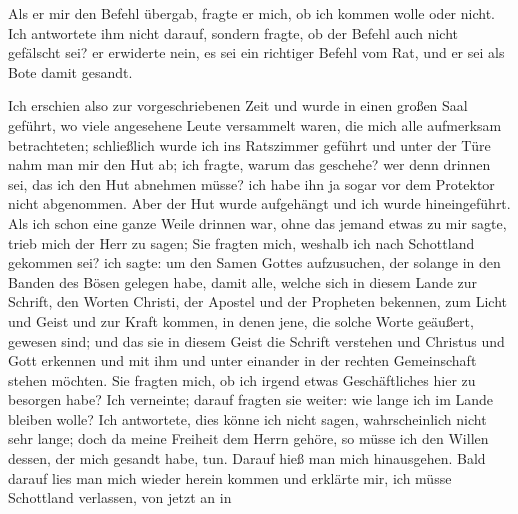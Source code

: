 

Als er mir den Befehl übergab, fragte er mich, ob ich kommen
wolle oder nicht. Ich antwortete ihm nicht darauf, sondern
fragte, ob der Befehl auch nicht gefälscht sei? er erwiderte nein,
es sei ein richtiger Befehl vom Rat, und er sei als Bote damit
gesandt. 


Ich erschien also zur vorgeschriebenen Zeit und wurde in
einen großen Saal geführt, wo viele angesehene Leute versammelt
waren, die mich alle aufmerksam betrachteten; schließlich wurde
ich ins Ratszimmer geführt und unter der Türe nahm man mir
den Hut ab; ich fragte, warum das 
geschehe? wer denn drinnen
sei, das ich den Hut abnehmen müsse? ich habe ihn ja sogar vor
dem Protektor nicht abgenommen. Aber der Hut wurde aufgehängt 
und ich wurde hineingeführt. Als ich schon eine ganze
Weile drinnen war, ohne das jemand etwas zu mir sagte, trieb
mich der Herr zu sagen; 
Sie fragten mich, weshalb ich nach Schottland gekommen sei? ich
sagte: um den Samen Gottes aufzusuchen, der solange in den
Banden des Bösen gelegen habe, damit alle, welche sich in diesem
Lande zur Schrift, den Worten Christi, der Apostel und der 
Propheten bekennen, zum Licht und Geist und zur Kraft kommen, in
denen jene, die solche Worte geäußert, gewesen sind; und das sie
in diesem Geist die Schrift verstehen und Christus und Gott 
erkennen und mit ihm und unter einander in der rechten 
Gemeinschaft stehen möchten. Sie fragten mich, ob ich irgend etwas 
Geschäftliches hier zu besorgen habe? Ich verneinte; darauf fragten
sie weiter: wie lange ich im Lande bleiben wolle? Ich antwortete,
dies könne ich nicht sagen, wahrscheinlich nicht sehr lange; doch
da meine Freiheit dem Herrn gehöre, so müsse ich den Willen
dessen, der mich gesandt habe, tun. Darauf hieß man mich 
hinausgehen. Bald darauf lies man mich wieder herein kommen
und erklärte mir, ich müsse Schottland verlassen, von jetzt an in
